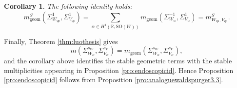 \documentclass[12pt]{amsart}
\numberwithin{equation}{subsection}
\newcommand{\BR}{{\mathbb {R}}}
\newcommand{\SO}{{\mathrm{SO}}}
\def\alp{{\alpha}}
\def\Sig{{\Sigma}}
\def\geom{\mathrm{geom}}
\def\qs{\mathrm{qs}}
\def\SO{\mathrm{SO}}
\newtheorem{cor}[thm]{Corollary}
\begin{document}
\begin{cor}\label{cor:analoguewaldspurger3.3}
The following identity holds:
\[
m^S_\geom(\Sig^1_{W_\qs},\Sig^1_{V_\qs}) =
\sum_{
\alp\in H^1(\BR,\SO(W))
}
m_\geom(\Sig^{-1}_{W_\alp},\Sig^1_{V_\alp}) = m^S_{W_\qs,V_\qs}.
\]
\end{cor}

Finally, Theorem \ref{thm:luothesis} gives
\[
m(\Sig^{s_W}_{W_\alp},\Sig^{s_V}_{V_\alp})
=
m_\geom(\Sig^{s_W}_{W_\alp},\Sig^{s_V}_{V_\alp}),
\]
and the corollary above identifies the stable geometric terms with the stable
multiplicities appearing in Proposition \ref{pro:endoscopicid}. Hence
Proposition \ref{pro:endoscopicid} follows from Proposition
\ref{pro:analoguewaldspurger3.3}.







\end{document}
